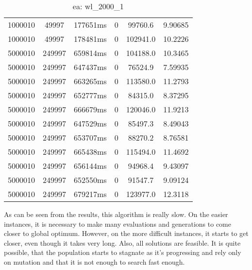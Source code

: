 \documentclass[./main.tex]{subfiles}
\begin{document}
\begin{table}
\begin{tabular}{ c | c | c | c | c | c }
        1000010 & 49997 & 177651ms & 0 & 99760.6 & 9.90685 \\
        1000010 & 49997 & 178481ms & 0 & 102941.0 & 10.2226 \\
        \hline
        5000010 & 249997 & 659814ms & 0 & 104188.0 & 10.3465 \\
        5000010 & 249997 & 647437ms & 0 & 76524.9 & 7.59935 \\
        5000010 & 249997 & 663265ms & 0 & 113580.0 & 11.2793 \\
        5000010 & 249997 & 652777ms & 0 & 84315.0 & 8.37295 \\
        5000010 & 249997 & 666679ms & 0 & 120046.0 & 11.9213 \\
        5000010 & 249997 & 647529ms & 0 & 85497.3 & 8.49043 \\
        5000010 & 249997 & 653707ms & 0 & 88270.2 & 8.76581 \\
        5000010 & 249997 & 665438ms & 0 & 115494.0 & 11.4692 \\
        \rowcolor{lightgray} 5000010 & 249997 & 656144ms & 0 & 94968.4 & 9.43097 \\
        5000010 & 249997 & 652550ms & 0 & 91547.7 & 9.09124 \\
        5000010 & 249997 & 679217ms & 0 & 123977.0 & 12.3118 \\
    \end{tabular}
    \caption{ea: wl\_2000\_1}
\end{table}

As can be seen from the results, this algorithm is really slow.
On the easier instances, it is necessary to make many evaluations and generations to come closer to global optimum.
However, on the more difficult instances, it starts to get closer, even though it takes very long.
Also, all solutions are feasible.
It is quite possible, that the population starts to stagnate as it's progressing and rely only on mutation and that it is not enough to search fast enough.
\end{document}
